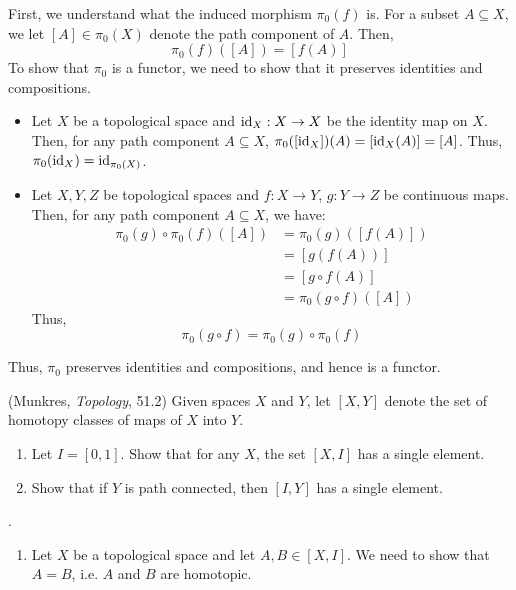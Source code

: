 \documentclass[12pt]{article}
\begin{document}
\begin{solu}
    First, we understand what the induced morphism $\pi_0(f)$ is. For a subset $A \subseteq X$, we let $[A] \in \pi_0(X)$ denote the path component of $A$. Then,
    \[ \pi_0(f)([A]) = [f(A)] \]   
    To show that $\pi_0$ is a functor, we need to show that it preserves identities and compositions.
    \begin{itemize}
        \item Let $X$ be a topological space and $\operatorname{id}_X : X \to X$ be the identity map on $X$. Then, for any path component $A\subseteq X$, $\pi_0([\operatorname{id}_X])(A) = [\operatorname{id}_X(A)] = [A]$. Thus, $\pi_0(\operatorname{id}_X) = \operatorname{id}_{\pi_0(X)}$.
        \item Let $X, Y, Z$ be topological spaces and $f: X \to Y$, $g: Y \to Z$ be continuous maps. Then, for any path component $A \subseteq X$, we have: 
        \begin{align*}
            \pi_0(g) \circ \pi_0(f)([A]) &= \pi_0(g)([f(A)]) \\
            &= [g(f(A))] \\
            &= [g \circ f(A)] \\
            &= \pi_0(g \circ f)([A])
        \end{align*}
        Thus, 
        \[ \pi_0(g \circ f) = \pi_0(g) \circ \pi_0(f) \]
    \end{itemize}
    Thus, $\pi_0$ preserves identities and compositions, and hence is a functor.
\end{solu}
\newpage

\begin{problab}{6} (Munkres, \emph{Topology}, 51.2) Given spaces $X$ and $Y$, let $[X,Y]$ denote the set of homotopy classes of maps of $X$ into $Y$.
\begin{enumerate}
\item Let $I = [0,1]$. Show that for any $X$, the set $[X,I]$ has a single element.
\item Show that if $Y$ is path connected, then $[I,Y]$ has a single element.
\end{enumerate}
\end{problab}

\begin{solu} .
    \begin{enumerate}
        \item Let $X$ be a topological space and let $A, B \in [X, I]$. We need to show that $A = B$, i.e. $A$ and $B$ are homotopic. 
    \end{enumerate}

\end{solu}
\newpage
\end{document}

